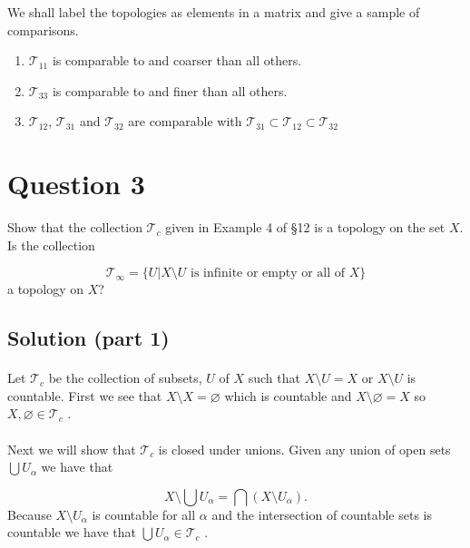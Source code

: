 \documentclass[11pt, oneside]{article}   	%
\begin{document}
We shall label the topologies as elements in a matrix and give a sample of comparisons.
\begin{enumerate}
\item $\mathscr{T}_{11}$ is comparable to and coarser than all others.

\item $\mathscr{T}_{33}$ is comparable to and finer than all others.

\item $\mathscr{T}_{12}$, $\mathscr{T}_{31}$ and $\mathscr{T}_{32}$ are comparable with $\mathscr{T}_{31} \subset \mathscr{T}_{12}  \subset  \mathscr{T}_{32}$
\end{enumerate}






\section*{Question 3}
Show that the collection $\mathscr{T}_c$ given in Example  4 of \S12 is a topology on the set $X$. Is the collection

\begin{equation*}
\mathscr{T}_\infty = \{U | X \setminus U \text{ is infinite or empty or all of } X \}
\end{equation*}
a topology on $X$?

\subsection*{Solution (part 1)}
\paragraph{}

Let $\mathscr{T}_c$ be the collection of subsets, $U$ of $X$ such that $X \setminus U = X$ or $X \setminus U$ is countable. First we see that $X \setminus X = \varnothing$ which is countable and $X \setminus \varnothing = X$ so $X, \varnothing \in \mathscr{T}_c$ . 

\paragraph{}
Next we will show that $\mathscr{T}_c$ is closed under unions. Given any union of open sets $\bigcup U_\alpha$ we have that

\[
X \setminus \bigcup U_\alpha = \bigcap (X \setminus U_\alpha).
\]
Because $X \setminus U_\alpha$ is countable for all $\alpha$ and the intersection of countable sets is countable we have that $\bigcup U_\alpha \in \mathscr{T}_c$ .
\end{document}
